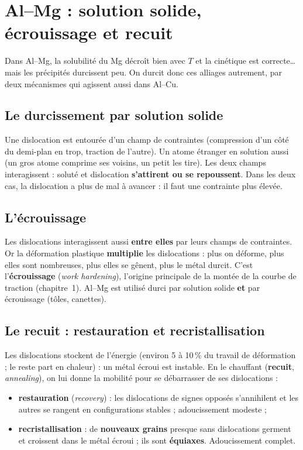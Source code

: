 \section{Al--Mg : solution solide, écrouissage et recuit}

Dans Al--Mg, la solubilité du Mg décroît bien avec $T$ et la cinétique est correcte\ldots{} mais
les précipités durcissent peu. On durcit donc ces alliages autrement, par deux mécanismes qui
agissent aussi dans Al--Cu.

\subsection*{Le durcissement par solution solide}

Une dislocation est entourée d'un champ de contraintes (compression d'un côté du demi-plan en
trop, traction de l'autre). Un atome étranger en solution aussi (un gros atome comprime ses
voisins, un petit les tire). Les deux champs interagissent : soluté et dislocation
\textbf{s'attirent ou se repoussent}. Dans les deux cas, la dislocation a plus de mal à
avancer : il faut une contrainte plus élevée.


\subsection*{L'écrouissage}

Les dislocations interagissent aussi \textbf{entre elles} par leurs champs de contraintes. Or
la déformation plastique \textbf{multiplie} les dislocations : plus on déforme, plus elles sont
nombreuses, plus elles se gênent, plus le métal durcit. C'est l'\textbf{écrouissage}
(\emph{work hardening}), l'origine principale de la montée de la courbe de traction (chapitre~1).
Al--Mg est utilisé durci par solution solide \textbf{et} par écrouissage (tôles, canettes).

\subsection*{Le recuit : restauration et recristallisation}

Les dislocations stockent de l'énergie (environ 5 à 10\,\% du travail de déformation ; le reste
part en chaleur) : un métal écroui est instable. En le chauffant (\textbf{recuit},
\emph{annealing}), on lui donne la mobilité pour se débarrasser de ses dislocations :
\begin{itemize}
  \item \textbf{restauration} (\emph{recovery}) : les dislocations de signes opposés
        s'annihilent et les autres se rangent en configurations stables ; adoucissement
        modeste ;
  \item \textbf{recristallisation} : de \textbf{nouveaux grains} presque sans dislocations
        germent et croissent dans le métal écroui ; ils sont \textbf{équiaxes}. Adoucissement
        complet.
\end{itemize}

